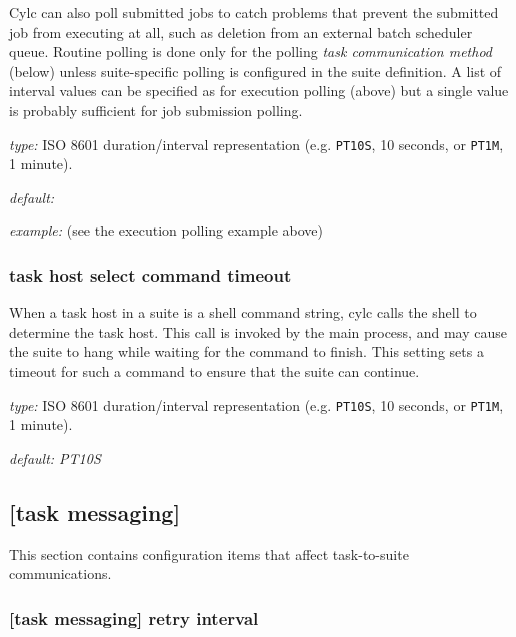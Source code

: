 Cylc can also poll submitted jobs to catch problems that prevent the
submitted job from executing at all, such as deletion from an external
batch scheduler queue. Routine polling is done only for the polling {\em
task communication method} (below) unless suite-specific polling
is configured in the suite definition. A list of interval
values can be specified as for execution polling (above) but a single
value is probably sufficient for job submission polling.

\begin{myitemize}
\item {\em type:} ISO 8601 duration/interval representation (e.g.
\lstinline=PT10S=, 10 seconds, or \lstinline=PT1M=, 1 minute).
\item {\em default:}
\item {\em example:} (see the execution polling example above)
\end{myitemize}

\subsubsection{task host select command timeout}

When a task host in a suite is a shell command string, cylc calls the shell to
determine the task host. This call is invoked by the main process, and may
cause the suite to hang while waiting for the command to finish. This setting
sets a timeout for such a command to ensure that the suite can continue.

\begin{myitemize}
\item {\em type:} ISO 8601 duration/interval representation (e.g.
\lstinline=PT10S=, 10 seconds, or \lstinline=PT1M=, 1 minute).
\item {\em default: PT10S}
\end{myitemize}

\subsection{[task messaging]}

This section contains configuration items that affect task-to-suite
communications.

\subsubsection[retry interval]{[task messaging] \textrightarrow retry interval}

